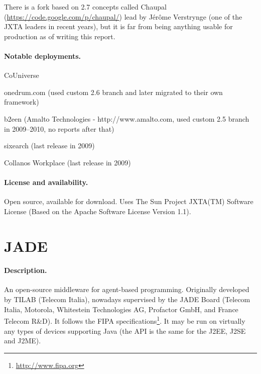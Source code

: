 \documentclass[a4paper]{report}
\begin{document}
There is a fork based on 2.7 concepts called Chaupal
(\url{https://code.google.com/p/chaupal/}) lead by J\'{e}r\^{o}me Verstrynge
(one of the JXTA leaders in recent years), but it is far from being anything
usable for production as of writing this report.

\paragraph{Notable deployments.}

\begin{compactitem}

\item CoUniverse

\item onedrum.com (used custom 2.6 branch and later migrated to their own
framework)

\item b2een (Amalto Technologies - http://www.amalto.com, used custom 2.5
branch in 2009--2010, no reports after that)

\item sixearch (last release in 2009)

\item Collanos Workplace (last release in 2009)

\end{compactitem}


\paragraph{License and availability.}

Open source, available for download. Uses The Sun Project JXTA(TM) Software License (Based on the Apache Software License Version 1.1).


\section{JADE}

\paragraph{Description.} An open-source middleware for agent-based programming. Originally developed by TILAB (Telecom Italia), nowadays supervised by the JADE Board (Telecom Italia, Motorola, Whitestein Technologies AG, Profactor GmbH, and France Telecom R\&D). It follows the FIPA specifications\footnote{\url{http://www.fipa.org}}. It may be run on virtually any types of devices supporting Java (the API is the same for the J2EE, J2SE and J2ME).
\end{document}
